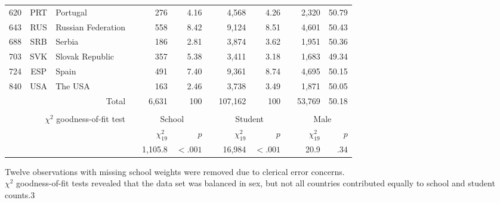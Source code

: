 {\begin{tabular}{ccl c rr c rr c rr}
      620   & PRT   & Portugal &       & 276   & 4.16 &       & 4,568  & 4.26 &       & 2,320  & 50.79 \\
      643   & RUS   & Russian Federation &       & 558   & 8.42 &       & 9,124  & 8.51 &       & 4,601  & 50.43 \\
      688   & SRB   & Serbia &       & 186   & 2.81 &       & 3,874  & 3.62 &       & 1,951  & 50.36 \\
      703   & SVK   & Slovak Republic &       & 357   & 5.38 &       & 3,411  & 3.18 &       & 1,683  & 49.34 \\
      724   & ESP   & Spain &       & 491   & 7.40 &       & 9,361  & 8.74 &       & 4,695  & 50.15 \\
      840   & USA   & The USA &       & 163   & 2.46 &       & 3,738  & 3.49 &       & 1,871  & 50.05 \\
      \bottomrule
            &       & \multicolumn{1}{r}{Total} &       & 6,631  & 100 &       & 107,162 & 100 &       & 53,769 & 50.18 \\
      &&&&&&&&&&&\\
      \multicolumn{3}{r}{$\chi^2$ goodness-of-fit test} && \multicolumn{2}{c}{School} &       & \multicolumn{2}{c}{Student} &       & \multicolumn{2}{c}{Male} \\
      \cmidrule{5-6}\cmidrule{8-9}\cmidrule{11-12}
      &&&& $\chi^2_{19}$ & $p$ && $\chi^2_{19}$ & $p$ && $\chi^2_{19}$ & $p$\\
      \cmidrule{5-12}
      &&&& 1,105.8 & $<.001$ && 16,984 & $<.001$ && 20.9 & $.34$\\
      \end{tabular}
}{Twelve observations with missing school weights were removed due to clerical error concerns.\\$\chi^2$ goodness-of-fit tests revealed that the data set was balanced in sex, but not all countries contributed equally to school and student counts.}{3}